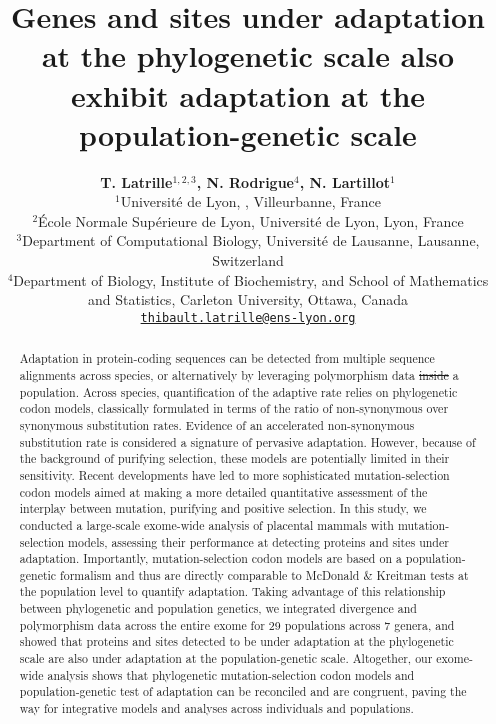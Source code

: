 \documentclass{article}
\title{Genes and sites under adaptation at the phylogenetic scale also exhibit adaptation at the population-genetic scale}
\author{
    \large
    \textbf{T. {Latrille}$^{1,2,3}$, N. {Rodrigue}$^{4}$, N. {Lartillot}$^{1}$}\\
    \normalsize
    $^{1}$Université de Lyon, \DIFdelbegin \DIFdel{CNRS, LBBE UMR 5558}\DIFdelend \DIFaddbegin \DIFadd{Université Lyon 1, CNRS, VetAgro Sup, Laboratoire de Biométrie et Biologie Evolutive, UMR5558}\DIFaddend , Villeurbanne, France\\
    $^{2}$École Normale Supérieure de Lyon, Université de Lyon, Lyon, France\\
    $^{3}$Department of Computational Biology, Université de Lausanne, Lausanne, Switzerland\\
    $^{4}$Department of Biology, Institute of Biochemistry, and School of Mathematics and Statistics, Carleton University, Ottawa, Canada \\
    \texttt{\href{mailto:thibault.latrille@ens-lyon.org}{thibault.latrille@ens-lyon.org}} \\
}
\providecommand{\DIFaddtex}[1]{{\protect\color{blue}\uwave{#1}}} %
\providecommand{\DIFdeltex}[1]{{\protect\color{red}\sout{#1}}}                      %
\providecommand{\DIFaddbegin}{} %
\providecommand{\DIFaddend}{} %
\providecommand{\DIFdelbegin}{} %
\providecommand{\DIFdelend}{} %
\providecommand{\DIFadd}[1]{\texorpdfstring{\DIFaddtex{#1}}{#1}} %
\providecommand{\DIFdel}[1]{\texorpdfstring{\DIFdeltex{#1}}{}} %
\newcommand{\DIFscaledelfig}{0.5}
\newlength{\DIFdelgraphicswidth} %
\newlength{\DIFdelgraphicsheight} %
\newcommand{\DIFaddincludegraphics}[2][]{{\color{blue}\fbox{\DIFOincludegraphics[#1]{#2}}}} %
\newcommand{\DIFdelincludegraphics}[2][]{%
\sbox{\DIFdelgraphicsbox}{\DIFOincludegraphics[#1]{#2}}%
\settoboxwidth{\DIFdelgraphicswidth}{\DIFdelgraphicsbox} %
\settoboxtotalheight{\DIFdelgraphicsheight}{\DIFdelgraphicsbox} %
\scalebox{\DIFscaledelfig}{%
\parbox[b]{\DIFdelgraphicswidth}{\usebox{\DIFdelgraphicsbox}\\[-\baselineskip] \rule{\DIFdelgraphicswidth}{0em}}\llap{\resizebox{\DIFdelgraphicswidth}{\DIFdelgraphicsheight}{%
\setlength{\unitlength}{\DIFdelgraphicswidth}%
\begin{picture}(1,1)%
\thicklines\linethickness{2pt} %
{\color[rgb]{1,0,0}\put(0,0){\framebox(1,1){}}}%
{\color[rgb]{1,0,0}\put(0,0){\line( 1,1){1}}}%
{\color[rgb]{1,0,0}\put(0,1){\line(1,-1){1}}}%
\end{picture}%
}\hspace*{3pt}}} %
} %
\DeclareRobustCommand{\DIFaddbegin}{\DIFOaddbegin \let\includegraphics\DIFaddincludegraphics} %
\DeclareRobustCommand{\DIFaddend}{\DIFOaddend \let\includegraphics\DIFOincludegraphics} %
\DeclareRobustCommand{\DIFdelbegin}{\DIFOdelbegin \let\includegraphics\DIFdelincludegraphics} %
\DeclareRobustCommand{\DIFdelend}{\DIFOaddend \let\includegraphics\DIFOincludegraphics} %
\begin{document}
    \maketitle

    \begin{abstract}
        Adaptation in protein-coding sequences can be detected from multiple sequence alignments across species, or alternatively by leveraging polymorphism data \DIFdelbegin \DIFdel{inside }\DIFdelend \DIFaddbegin \DIFadd{within }\DIFaddend a population.
        Across species, quantification of the adaptive rate relies on phylogenetic codon models, classically formulated in terms of the ratio of non-synonymous over synonymous substitution rates.
        Evidence of an accelerated non-synonymous substitution rate is considered a signature of pervasive adaptation.
        However, because of the background of purifying selection, these models are potentially limited in their sensitivity.
        Recent developments have led to more sophisticated mutation-selection codon models aimed at making a more detailed quantitative assessment of the interplay between mutation, purifying and positive selection.
        In this study, we conducted a large-scale exome-wide analysis of placental mammals with mutation-selection models, assessing their performance at detecting proteins and sites under adaptation.
        Importantly, mutation-selection codon models are based on a population-genetic formalism and thus are directly comparable to McDonald \& Kreitman tests at the population level to quantify adaptation.
        Taking advantage of this relationship between phylogenetic and population genetics, we integrated divergence and polymorphism data across the entire exome for 29 populations across 7 genera, and showed that proteins and sites detected to be under adaptation at the phylogenetic scale are also under adaptation at the population-genetic scale.
        Altogether, our exome-wide analysis shows that phylogenetic mutation-selection codon models and population-genetic test of adaptation can be reconciled and are congruent, paving the way for integrative models and analyses across individuals and populations.
    \end{abstract}

\end{document}
